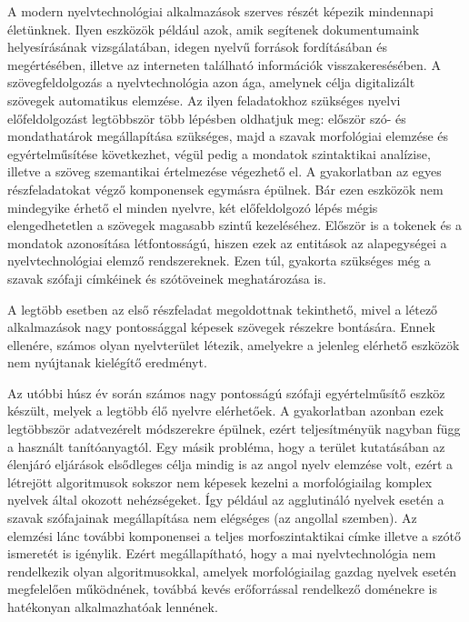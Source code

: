
A modern nyelvtechnológiai alkalmazások szerves részét képezik mindennapi életünknek.
Ilyen eszközök például azok, amik segítenek dokumentumaink helyesírásának vizsgálatában, idegen nyelvű források fordításában és megértésében, illetve az interneten található információk visszakeresésében.
A szövegfeldolgozás a nyelvtechnológia azon ága, amelynek célja digitalizált szövegek automatikus elemzése.
Az ilyen feladatokhoz szükséges nyelvi előfeldolgozást legtöbbször több lépésben oldhatjuk meg: először szó- és mondathatárok megállapítása szükséges, majd a szavak morfológiai elemzése és egyértelműsítése következhet, végül pedig a mondatok szintaktikai analízise, illetve a szöveg szemantikai értelmezése végezhető el.
A gyakorlatban az egyes részfeladatokat végző komponensek egymásra épülnek.
Bár ezen eszközök nem mindegyike érhető el minden nyelvre, két előfeldolgozó lépés mégis elengedhetetlen a szövegek magasabb szintű kezeléséhez. 
Először is a tokenek és a mondatok azonosítása létfontosságú, hiszen ezek az entitások az alapegységei a nyelvtechnológiai elemző rendszereknek.
Ezen túl, gyakorta szükséges még a szavak szófaji címkéinek és szótöveinek meghatározása is.

A legtöbb esetben az első részfeladat megoldottnak tekinthető, mivel a létező alkalmazások nagy pontossággal képesek szövegek részekre bontására.
Ennek ellenére, számos olyan nyelvterület létezik, amelyekre a jelenleg elérhető eszközök nem nyújtanak kielégítő eredményt.

Az utóbbi húsz év során számos nagy pontosságú szófaji egyértelműsítő eszköz készült, melyek a legtöbb élő nyelvre elérhetőek.
A gyakorlatban azonban ezek legtöbbször adatvezérelt módszerekre épülnek, ezért teljesítményük nagyban függ a használt tanítóanyagtól.
Egy másik probléma, hogy a terület kutatásában az élenjáró eljárások elsődleges célja mindig is az angol nyelv elemzése volt, ezért a létrejött algoritmusok sokszor nem képesek kezelni a morfológiailag komplex nyelvek által okozott nehézségeket.
Így például az agglutináló nyelvek esetén a szavak szófajainak megállapítása nem elégséges (az angollal szemben).
Az elemzési lánc további komponensei a teljes morfoszintaktikai címke illetve a szótő ismeretét is igénylik.
Ezért megállapítható, hogy a mai nyelvtechnológia nem rendelkezik olyan algoritmusokkal, amelyek morfológiailag gazdag nyelvek esetén megfelelően működnének, továbbá kevés erőforrással rendelkező doménekre is hatékonyan alkalmazhatóak lennének.

